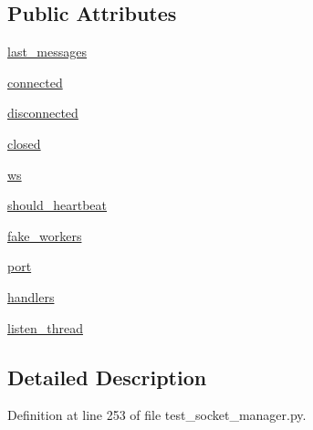 \subsection*{Public Attributes}
\begin{DoxyCompactItemize}
\item 
\hyperlink{classparlai_1_1mturk_1_1core_1_1test_1_1test__socket__manager_1_1MockSocket_a42a347cb3c318dbec504faba065e2186}{last\+\_\+messages}
\item 
\hyperlink{classparlai_1_1mturk_1_1core_1_1test_1_1test__socket__manager_1_1MockSocket_aabc1cc6796247db920bc5e36bc245b1c}{connected}
\item 
\hyperlink{classparlai_1_1mturk_1_1core_1_1test_1_1test__socket__manager_1_1MockSocket_ae83a76b1642457255c25ef378497cee1}{disconnected}
\item 
\hyperlink{classparlai_1_1mturk_1_1core_1_1test_1_1test__socket__manager_1_1MockSocket_a780461a398bbc8e99b6a149921e16f4d}{closed}
\item 
\hyperlink{classparlai_1_1mturk_1_1core_1_1test_1_1test__socket__manager_1_1MockSocket_ae2988bb7b53c335c9bdda34f592ae40c}{ws}
\item 
\hyperlink{classparlai_1_1mturk_1_1core_1_1test_1_1test__socket__manager_1_1MockSocket_a5ea30f810f115aa211cc2b61356e1cde}{should\+\_\+heartbeat}
\item 
\hyperlink{classparlai_1_1mturk_1_1core_1_1test_1_1test__socket__manager_1_1MockSocket_a6d9a577d355cbea83c81bfd0e6412b83}{fake\+\_\+workers}
\item 
\hyperlink{classparlai_1_1mturk_1_1core_1_1test_1_1test__socket__manager_1_1MockSocket_a877e6aa7efaa5ad3e19d17a5db5bb825}{port}
\item 
\hyperlink{classparlai_1_1mturk_1_1core_1_1test_1_1test__socket__manager_1_1MockSocket_a202a039dee0fd4cca724ce0914d303eb}{handlers}
\item 
\hyperlink{classparlai_1_1mturk_1_1core_1_1test_1_1test__socket__manager_1_1MockSocket_ac68a12582d8a0e13acc7677616401c0f}{listen\+\_\+thread}
\end{DoxyCompactItemize}


\subsection{Detailed Description}


Definition at line 253 of file test\+\_\+socket\+\_\+manager.\+py.



